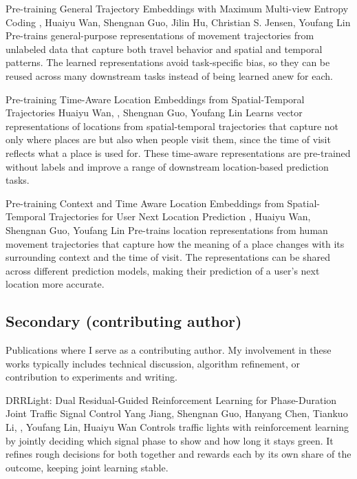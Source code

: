 {Pre-training General Trajectory Embeddings with Maximum Multi-view Entropy Coding}
{\me, Huaiyu Wan, Shengnan Guo, Jilin Hu, Christian S. Jensen, Youfang Lin}
{Pre-trains general-purpose representations of movement trajectories from unlabeled data that capture both travel behavior and spatial and temporal patterns. The learned representations avoid task-specific bias, so they can be reused across many downstream tasks instead of being learned anew for each.}

{Pre-training Time-Aware Location Embeddings from Spatial-Temporal Trajectories}
{Huaiyu Wan, \me, Shengnan Guo, Youfang Lin}
{Learns vector representations of locations from spatial-temporal trajectories that capture not only where places are but also when people visit them, since the time of visit reflects what a place is used for. These time-aware representations are pre-trained without labels and improve a range of downstream location-based prediction tasks.}

{Pre-training Context and Time Aware Location Embeddings from Spatial-Temporal Trajectories for User Next Location Prediction}
{\me, Huaiyu Wan, Shengnan Guo, Youfang Lin}
{Pre-trains location representations from human movement trajectories that capture how the meaning of a place changes with its surrounding context and the time of visit. The representations can be shared across different prediction models, making their prediction of a user's next location more accurate.}

\subsection*{Secondary (contributing author)}
Publications where I serve as a contributing author. My involvement in these works typically includes technical discussion, algorithm refinement, or contribution to experiments and writing.

{DRRLight: Dual Residual-Guided Reinforcement Learning for Phase-Duration Joint Traffic Signal Control}
{Yang Jiang, Shengnan Guo, Hanyang Chen, Tiankuo Li, \me, Youfang Lin, Huaiyu Wan}
{Controls traffic lights with reinforcement learning by jointly deciding which signal phase to show and how long it stays green. It refines rough decisions for both together and rewards each by its own share of the outcome, keeping joint learning stable.}

